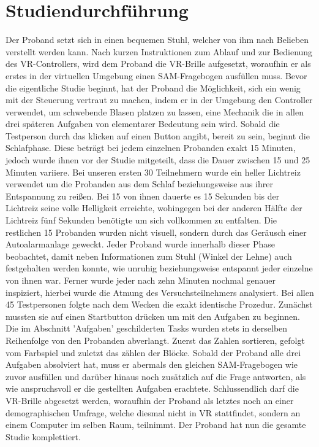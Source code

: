 \section{Studiendurchführung}
Der Proband setzt sich in einen bequemen Stuhl, welcher von ihm nach Belieben verstellt werden kann. Nach kurzen Instruktionen zum Ablauf und zur Bedienung des VR-Controllers, wird dem Proband die VR-Brille aufgesetzt, woraufhin er als erstes in der virtuellen Umgebung einen SAM-Fragebogen ausfüllen muss. %
Bevor die eigentliche Studie beginnt, hat der Proband die Möglichkeit, sich ein wenig mit der Steuerung vertraut zu machen, indem er in der Umgebung den Controller verwendet, um schwebende Blasen platzen zu lassen, eine Mechanik die in allen drei späteren Aufgaben von elementarer Bedeutung sein wird. Sobald die Testperson durch das klicken auf einen Button angibt, bereit zu sein, beginnt die Schlafphase. Diese beträgt bei jedem einzelnen Probanden exakt 15 Minuten, jedoch wurde ihnen vor der Studie mitgeteilt, dass die Dauer zwischen 15 und 25 Minuten variiere. %
Bei unseren ersten 30 Teilnehmern wurde ein heller Lichtreiz verwendet um die Probanden aus dem Schlaf beziehungsweise aus ihrer Entspannung zu reißen. Bei 15 von ihnen dauerte es 15 Sekunden bis der Lichtreiz seine volle Helligkeit erreichte, wohingegen bei der anderen Hälfte der Lichtreiz fünf Sekunden benötigte um sich vollkommen zu entfalten.  Die restlichen 15 Probanden wurden nicht visuell, sondern durch das Geräusch einer Autoalarmanlage geweckt. %
Jeder Proband wurde innerhalb dieser Phase beobachtet, damit neben Informationen zum Stuhl (Winkel der Lehne) auch festgehalten werden konnte, wie unruhig beziehungsweise entspannt jeder einzelne von ihnen war. Ferner wurde jeder nach zehn Minuten nochmal genauer inspiziert, hierbei wurde die Atmung des Versuchsteilnehmers analysiert.
Bei allen 45 Testpersonen folgte nach dem Wecken die exakt identische Prozedur. Zunächst mussten sie auf einen Startbutton drücken um mit den Aufgaben zu beginnen. Die im Abschnitt 'Aufgaben' geschilderten Tasks wurden stets in derselben Reihenfolge von den Probanden abverlangt. Zuerst das Zahlen sortieren, gefolgt vom Farbspiel und zuletzt das zählen der Blöcke. %
Sobald der Proband alle drei Aufgaben absolviert hat, muss er abermals den gleichen SAM-Fragebogen wie zuvor ausfüllen und darüber hinaus noch zusätzlich auf die Frage antworten, als wie anspruchsvoll er die gestellten Aufgaben erachtete.
Schlussendlich darf die VR-Brille abgesetzt werden, woraufhin der Proband als letztes noch an einer demographischen Umfrage, welche diesmal nicht in VR stattfindet, sondern an einem Computer im selben Raum, teilnimmt. Der Proband hat nun die gesamte Studie komplettiert.
